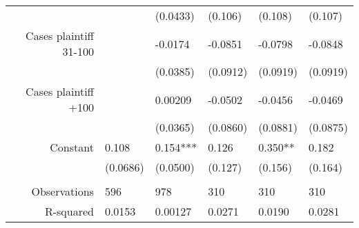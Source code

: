 \begin{tabular}{rrrrrr}
      & \multicolumn{1}{l}{} & \multicolumn{1}{l}{(0.0433)} & \multicolumn{1}{l}{(0.106)} & \multicolumn{1}{l}{(0.108)} & \multicolumn{1}{l}{(0.107)} \\
Cases plaintiff 31-100 & \multicolumn{1}{l}{} & \multicolumn{1}{l}{-0.0174} & \multicolumn{1}{l}{-0.0851} & \multicolumn{1}{l}{-0.0798} & \multicolumn{1}{l}{-0.0848} \\
      & \multicolumn{1}{l}{} & \multicolumn{1}{l}{(0.0385)} & \multicolumn{1}{l}{(0.0912)} & \multicolumn{1}{l}{(0.0919)} & \multicolumn{1}{l}{(0.0919)} \\
Cases plaintiff +100 & \multicolumn{1}{l}{} & \multicolumn{1}{l}{0.00209} & \multicolumn{1}{l}{-0.0502} & \multicolumn{1}{l}{-0.0456} & \multicolumn{1}{l}{-0.0469} \\
      & \multicolumn{1}{l}{} & \multicolumn{1}{l}{(0.0365)} & \multicolumn{1}{l}{(0.0860)} & \multicolumn{1}{l}{(0.0881)} & \multicolumn{1}{l}{(0.0875)} \\
Constant & \multicolumn{1}{l}{0.108} & \multicolumn{1}{l}{0.154***} & \multicolumn{1}{l}{0.126} & \multicolumn{1}{l}{0.350**} & \multicolumn{1}{l}{0.182} \\
      & \multicolumn{1}{l}{(0.0686)} & \multicolumn{1}{l}{(0.0500)} & \multicolumn{1}{l}{(0.127)} & \multicolumn{1}{l}{(0.156)} & \multicolumn{1}{l}{(0.164)} \\
      & \multicolumn{1}{l}{} & \multicolumn{1}{l}{} & \multicolumn{1}{l}{} & \multicolumn{1}{l}{} & \multicolumn{1}{l}{} \\
Observations & \multicolumn{1}{l}{596} & \multicolumn{1}{l}{978} & \multicolumn{1}{l}{310} & \multicolumn{1}{l}{310} & \multicolumn{1}{l}{310} \\
R-squared & \multicolumn{1}{l}{0.0153} & \multicolumn{1}{l}{0.00127} & \multicolumn{1}{l}{0.0271} & \multicolumn{1}{l}{0.0190} & \multicolumn{1}{l}{0.0281} \\
\bottomrule
\end{tabular}%
